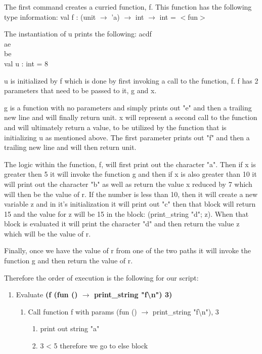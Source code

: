 \begin{enumerate}
The first command creates a curried function, f.  This function has the following type information:
val f : (unit \(\rightarrow\) 'a) \(\rightarrow\) int \(\rightarrow\) int = \(<\)fun\(>\)

The instantiation of u prints the following:
acdf\\
ae\\
be\\
val u : int = 8

u is initialized by f which is done by first invoking a call to the function, f.  f has 2 parameters that need to be passed to it, g and x.

g is a function with no parameters and simply prints out "e" and then a trailing new line and will finally return unit.
x will represent a second call to the function and will ultimately return a value, to be utilized by the function that is initializing u as mentioned above.  The first parameter prints out "f" and then a trailing new line and will then return unit. 

The logic within the function, f, will first print out the character "a".  Then if x is greater then 5 it will invoke the function g  and then if x is also greater than 10 it will print out the character "b" as well as return the value x reduced by 7 which will then be the value of r.  If the number is less than 10, then it will create a new variable z and in it's initialization it will print out "c" then that block will return 15 and the value for z will be 15 in the block: (print\_string "d"; z).  When that block is evaluated it will print the character "d" and then return the value z  which will be the value of r.

Finally, once we have the value of r from one of the two paths it will invoke the function g and then return the value of r.

Therefore the order of execution is the following for our script:
\begin{enumerate}
	\item Evaluate \textbf{(f (fun () \(\rightarrow\) print\_string "f\textbackslash n") 3)}
		\begin{enumerate}
			\item Call function f with params (fun () \(\rightarrow\) print\_string "f\textbackslash n"), 3 
			\begin{enumerate}
				\item print out string "a" 
				
				\item 3 < 5 therefore we go to else block 
				

\end{enumerate}
\end{enumerate}
\end{enumerate}
\end{enumerate}
